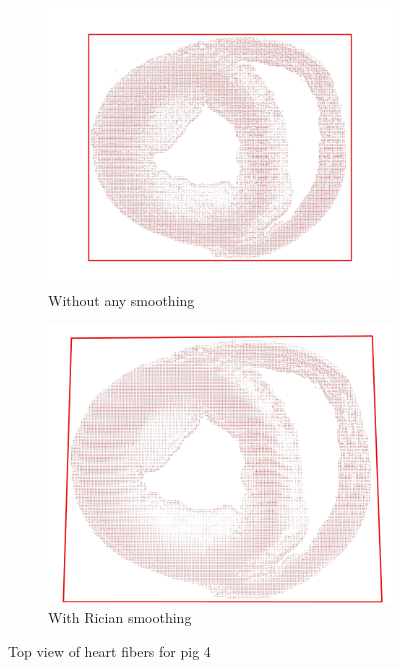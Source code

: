 \begin{figure}
    \centering
    \begin{subfigure}{.48\textwidth}
        \includegraphics[width=\textwidth]{figures/pig4_topview_no_smooth}
        \caption{Without any smoothing}
        \label{fig:pig4_topview_no_smooth}
    \end{subfigure}
    \begin{subfigure}{.48\textwidth}
        \includegraphics[width=\textwidth]{figures/pig4_topview_smooth}
        \caption{With Rician smoothing}
        \label{fig:pig4_topview_smooth}
    \end{subfigure}
    \caption{Top view of heart fibers for pig 4}
    \label{fig:pig4_topviews}
\end{figure}

